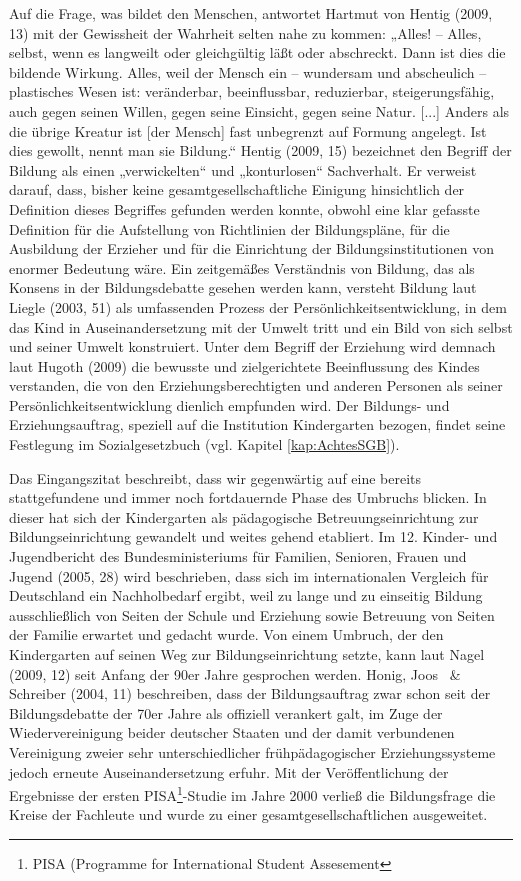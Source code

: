 Auf die Frage, was bildet den Menschen, antwortet Hartmut von Hentig (2009, 13) mit der Gewissheit der Wahrheit selten nahe zu kommen: „Alles! -- Alles, selbst, wenn es langweilt oder gleichgültig läßt oder abschreckt. Dann ist dies die bildende Wirkung. Alles, weil der Mensch ein -- wundersam und abscheulich -- plastisches Wesen ist: veränderbar, beeinflussbar, reduzierbar, steigerungsfähig, auch gegen seinen Willen, gegen seine Einsicht, gegen seine Natur. [...] Anders als die übrige Kreatur ist [der Mensch] fast unbegrenzt auf Formung angelegt. Ist dies gewollt, nennt man sie Bildung.“ 
Hentig (2009, 15) bezeichnet den Begriff der Bildung als einen „verwickelten“ und „konturlosen“ Sachverhalt. Er verweist darauf, dass,  bisher keine gesamtgesellschaftliche Einigung hinsichtlich der Definition dieses Begriffes gefunden werden konnte, obwohl eine klar gefasste Definition für die Aufstellung von Richtlinien der Bildungspläne, für die Ausbildung der Erzieher und für die Einrichtung der Bildungsinstitutionen von enormer Bedeutung wäre. 
Ein zeitgemäßes Verständnis von Bildung, das als Konsens in der Bildungsdebatte gesehen werden kann, versteht Bildung laut Liegle (2003, 51) als umfassenden Prozess der Persönlichkeitsentwicklung, in dem das Kind in Auseinandersetzung mit der Umwelt tritt und ein  Bild von sich selbst und seiner Umwelt konstruiert. Unter dem Begriff der Erziehung wird demnach laut Hugoth (2009) die bewusste und zielgerichtete Beeinflussung des Kindes verstanden, die von den Erziehungsberechtigten und anderen Personen als seiner Persönlichkeitsentwicklung dienlich empfunden wird. Der Bildungs- und Erziehungsauftrag, speziell auf die Institution Kindergarten bezogen, findet seine Festlegung im Sozialgesetzbuch (vgl. Kapitel \ref{kap:AchtesSGB}). 

Das Eingangszitat beschreibt, dass wir gegenwärtig auf eine bereits stattgefundene und immer noch fortdauernde Phase des Umbruchs blicken. In dieser hat sich der Kindergarten als pädagogische Betreuungseinrichtung zur Bildungseinrichtung gewandelt und weites gehend etabliert. Im 12. Kinder- und Jugendbericht des Bundesministeriums für Familien, Senioren, Frauen und Jugend (2005, 28) wird beschrieben, dass sich im internationalen Vergleich für Deutschland ein Nachholbedarf ergibt, weil zu lange und zu einseitig Bildung ausschließlich von Seiten der Schule und Erziehung sowie Betreuung von Seiten der Familie erwartet und gedacht wurde. Von einem Umbruch, der den Kindergarten auf seinen Weg zur Bildungseinrichtung setzte, kann laut Nagel (2009, 12) seit Anfang der 90er Jahre gesprochen werden. Honig, Joos ~\& Schreiber (2004, 11) beschreiben, dass der Bildungsauftrag zwar schon seit der Bildungsdebatte der 70er Jahre als offiziell verankert galt, im Zuge der Wiedervereinigung beider deutscher Staaten und der damit verbundenen Vereinigung zweier sehr unterschiedlicher frühpädagogischer Erziehungssysteme jedoch erneute Auseinandersetzung erfuhr. Mit der Veröffentlichung der Ergebnisse der ersten PISA\footnote{PISA (Programme for International Student Assesement}-Studie im Jahre 2000 verließ die Bildungsfrage die Kreise der Fachleute und wurde zu einer gesamtgesellschaftlichen ausgeweitet.  

